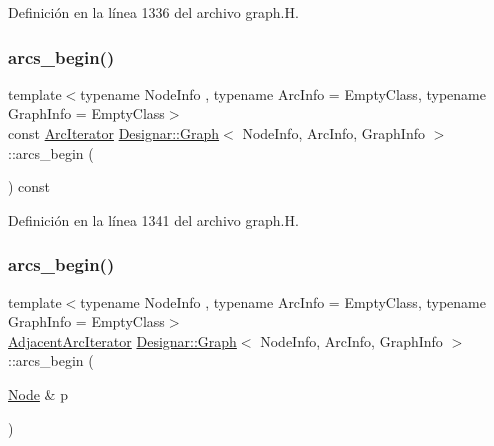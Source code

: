 Definición en la línea 1336 del archivo graph.\+H.

\mbox{\label{class_designar_1_1_graph_a3906cae09045bb9c037e1c3c4e64dd97}} 
\subsubsection{\texorpdfstring{arcs\+\_\+begin()}{arcs\_begin()}\hspace{0.1cm}{\footnotesize\ttfamily [2/4]}}
{\footnotesize\ttfamily template$<$typename Node\+Info , typename Arc\+Info  = Empty\+Class, typename Graph\+Info  = Empty\+Class$>$ \\
const \hyperlink{class_designar_1_1_graph_1_1_arc_iterator}{Arc\+Iterator} \hyperlink{class_designar_1_1_graph}{Designar\+::\+Graph}$<$ Node\+Info, Arc\+Info, Graph\+Info $>$\+::arcs\+\_\+begin (\begin{DoxyParamCaption}{ }\end{DoxyParamCaption}) const\hspace{0.3cm}{\ttfamily [inline]}}



Definición en la línea 1341 del archivo graph.\+H.

\mbox{\label{class_designar_1_1_graph_a9488f4193d227a690f46e91a11dd830a}} 
\subsubsection{\texorpdfstring{arcs\+\_\+begin()}{arcs\_begin()}\hspace{0.1cm}{\footnotesize\ttfamily [3/4]}}
{\footnotesize\ttfamily template$<$typename Node\+Info , typename Arc\+Info  = Empty\+Class, typename Graph\+Info  = Empty\+Class$>$ \\
\hyperlink{class_designar_1_1_graph_1_1_adjacent_arc_iterator}{Adjacent\+Arc\+Iterator} \hyperlink{class_designar_1_1_graph}{Designar\+::\+Graph}$<$ Node\+Info, Arc\+Info, Graph\+Info $>$\+::arcs\+\_\+begin (\begin{DoxyParamCaption}\item[{\hyperlink{class_designar_1_1_graph_a5dfc7dba9d092ac489c72e40390c37d0}{Node} \&}]{p }\end{DoxyParamCaption})\hspace{0.3cm}{\ttfamily [inline]}}



